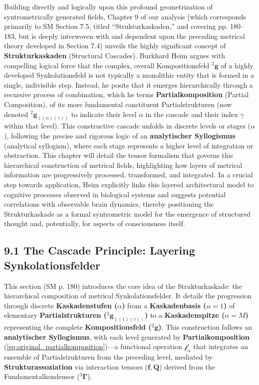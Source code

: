 \documentclass[12pt]{article}
\newcommand{\q}[1]{\enquote{#1}}
\newcommand{\kompositionsfeld}{{}^2\mathbf{g}}
\newcommand{\partialstruktur}[1]{{}^2\mathbf{g}_{(#1)}} %
\newcommand{\fundamentalkondensor}{{}^3\bm{\Gamma}}
\newcommand{\korrelationstensor}{\mathbf{f}}
\newcommand{\koppelungstensor}{\mathbf{Q}}
\newcommand{\kaskadenstufe}{\alpha}
\begin{document}
Building directly and logically upon this profound geometrization of syntrometrically generated fields, Chapter 9 of our analysis (which corresponds primarily to SM Section 7.5, titled \q{Strukturkaskaden,} and covering pp. 180–183, but is deeply interwoven with and dependent upon the preceding metrical theory developed in Section 7.4) unveils the highly significant concept of \textbf{Strukturkaskaden} (Structural Cascades). Burkhard Heim argues with compelling logical force that the complex, overall Kompositionsfeld \( \kompositionsfeld \) of a highly developed Synkolationsfeld is not typically a monolithic entity that is formed in a single, indivisible step. Instead, he posits that it emerges hierarchically through a recursive process of combination, which he terms \textbf{Partialkomposition} (Partial Composition), of its more fundamental constituent Partialstrukturen (now denoted \( \partialstruktur{(\alpha)(\gamma)} \) to indicate their level \( \alpha \) in the cascade and their index \( \gamma \) within that level). This constructive cascade unfolds in discrete levels or stages (\(\kaskadenstufe\)), following the precise and rigorous logic of an \textbf{analytischer Syllogismus} (analytical syllogism), where each stage represents a higher level of integration or abstraction. This chapter will detail the tensor formalism that governs this hierarchical construction of metrical fields, highlighting how layers of metrical information are progressively processed, transformed, and integrated. In a crucial step towards application, Heim explicitly links this layered architectural model to cognitive processes observed in biological systems and suggests potential correlations with observable brain dynamics, thereby positioning the Strukturkaskade as a formal syntrometric model for the emergence of structured thought and, potentially, for aspects of consciousness itself.

\subsection{9.1 The Cascade Principle: Layering Synkolationsfelder}
\label{sec:cascade_principle}

This section (SM p. 180) introduces the core idea of the Strukturkaskade: the hierarchical composition of metrical Synkolationsfelder. It details the progression through discrete \textbf{Kaskadenstufen (\(\kaskadenstufe\))} from a \textbf{Kaskadenbasis (\(\kaskadenstufe=1\))} of elementary \textbf{Partialstrukturen (\(\partialstruktur{(1)(\gamma)}\))} to a \textbf{Kaskadenspitze (\(\kaskadenstufe=M\))} representing the complete \textbf{Kompositionsfeld (\(\kompositionsfeld\))}. This construction follows an \textbf{analytischer Syllogismus}, with each level generated by \textbf{Partialkomposition} (\eqref{eq:original_partialkomposition})—a functional operation \( \mathcal{f}_\alpha \) that integrates an ensemble of Partialstrukturen from the preceding level, mediated by \textbf{Strukturassoziation} via interaction tensors (\(\korrelationstensor, \koppelungstensor\)) derived from the Fundamentalkondensor (\(\fundamentalkondensor\)).
\end{document}
